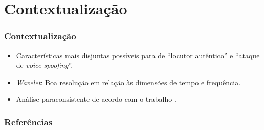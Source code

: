 \documentclass{beamer}
\begin{document}
	\section{Contextualização}

	\begin{frame}
		\frametitle{Contextualização}
		\begin{itemize}
			\item Características mais disjuntas possíveis para de ``locutor autêntico'' e ``ataque de \textit{voice spoofing}''.
			\item \textit{Wavelet}: Boa resolução em relação às dimensões de tempo e frequência.
			\item Análise paraconsistente de acordo com o trabalho \cite{8588433}.
		\end{itemize}
	\end{frame}

	\begin{frame}[allowframebreaks]
		\frametitle{Referências}
		
		
	\end{frame}
	
\end{document}
